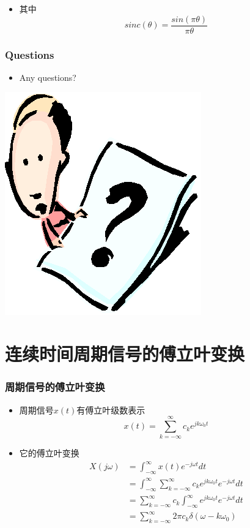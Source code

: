 \documentclass[CJKutf8,dvipsnames,table]{beamer}
\begin{document}
\begin{CJK*}{UTF8}{song}
\begin{frame}
\begin{itemize}
		\begin{itemize}
		\item 其中
    	\[
    		sinc(\theta) = \frac{sin(\pi\theta)}{\pi\theta}
    	\]	
		\end{itemize}	
    \end{itemize}

  \end{frame} 
     
  \begin{frame}
    \frametitle{Questions}
    \begin{itemize}
    \item Any questions?
    \end{itemize}
    \begin{center}
      \includegraphics[scale=.5]{question}
    \end{center}
  \end{frame} 
  
  \section{连续时间周期信号的傅立叶变换}
  
  \begin{frame}
    \frametitle{周期信号的傅立叶变换}
    \begin{itemize}
    \item 周期信号$x(t)$有傅立叶级数表示
    \[ 
    	x(t)=\sum_{k=-\infty}^{\infty}c_k e^{jk\omega_0 t} 
    \]
    \item 它的傅立叶变换
    	\begin{align*}
 		X(j\omega) & = \int_{-\infty}^{\infty}x(t)e^{-j\omega t}dt    \\
		& = \int_{-\infty}^{\infty}\sum_{k=-\infty}^{\infty}c_k e^{jk\omega_0 t}e^{-j\omega t}dt    \\
		& = \sum_{k=-\infty}^{\infty}c_k \int_{-\infty}^{\infty}e^{jk\omega_0 t}e^{-j\omega t}dt  \\
		& = \sum_{k=-\infty}^{\infty}2\pi c_k \delta(\omega-k\omega_0)
    	\end{align*}    
    \end{itemize}
  \end{frame}
  

\end{CJK*}
\end{document}
